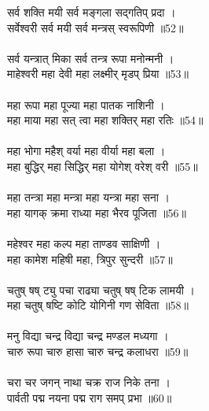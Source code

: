 सर्व शक्ति मयी सर्व मङ्गला सद्गतिप् प्रदा ।\\
सर्वेश्वरी सर्व मयी सर्व मन्त्रस् स्वरूपिणी ॥52॥\\
\\
सर्व यन्त्रात् मिका सर्व तन्त्र रूपा मनोन्मनी ।\\
माहेश्वरी महा देवी महा लक्ष्मीर् मृडप् प्रिया ॥53॥\\
\\
महा रूपा महा पूज्या महा पातक नाशिनी ।\\
महा माया महा सत् त्वा महा शक्तिर् महा रतिः ॥54॥\\
\\
महा भोगा महैश् वर्या महा वीर्या महा बला ।\\
महा बुद्धिर् महा सिद्धिर् महा योगेश् वरेश् वरी ॥55॥\\
\\
महा तन्त्रा महा मन्त्रा महा यन्त्रा महा सना ।\\
महा यागक् क्रमा राध्या महा भैरव पूजिता ॥56॥\\
\\
महेश्वर महा कल्प महा ताण्डव साक्षिणी ।\\
महा कामेश महिषी महा, त्रिपुर सुन्दरी ॥57॥\\
\\
चतुष् षष् ट्यु पचा राढ्या चतुष् षष् टिक लामयी ।\\
महा चतुष् षष्टि कोटि योगिनी गण सेविता ॥58॥\\
\\
मनु विद्या चन्द्र विद्या चन्द्र मण्डल मध्यगा ।\\
चारु रूपा चारु हासा चारु चन्द्र कलाधरा ॥59॥\\
\\
चरा चर जगन् नाथा चक्र राज निके तना ।\\
पार्वती पद्म नयना पद्म राग समप् प्रभा ॥60॥\\
